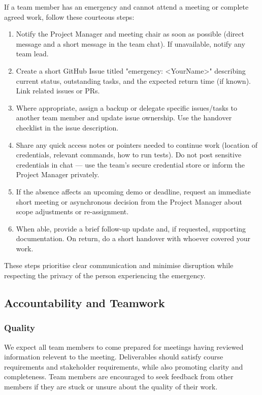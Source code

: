 \documentclass{article}
\begin{document}
If a team member has an emergency and cannot attend a meeting or complete agreed work, follow these courteous steps:
\begin{enumerate}
  \item Notify the Project Manager and meeting chair as soon as possible (direct message and a short message in the team chat). If unavailable, notify any team lead.
  \item Create a short GitHub Issue titled "emergency: <YourName>" describing current status, outstanding tasks, and the expected return time (if known). Link related issues or PRs.
  \item Where appropriate, assign a backup or delegate specific issues/tasks to another team member and update issue ownership. Use the handover checklist in the issue description.
  \item Share any quick access notes or pointers needed to continue work (location of credentials, relevant commands, how to run tests). Do not post sensitive credentials in chat — use the team's secure credential store or inform the Project Manager privately.
  \item If the absence affects an upcoming demo or deadline, request an immediate short meeting or asynchronous decision from the Project Manager about scope adjustments or re-assignment.
  \item When able, provide a brief follow-up update and, if requested, supporting documentation. On return, do a short handover with whoever covered your work.
\end{enumerate}

These steps prioritise clear communication and minimise disruption while respecting the privacy of the person experiencing the emergency.

\subsection*{Accountability and Teamwork}

\subsubsection*{Quality} 


We expect all team members to come prepared for meetings having reviewed information relevent to the meeting. Deliverables should satisfy course requirements and stakeholder requirements, while also promoting clarity and completeness.
Team members are encouraged to seek feedback from other members if they are stuck or unsure about the quality of their work.
\end{document}
